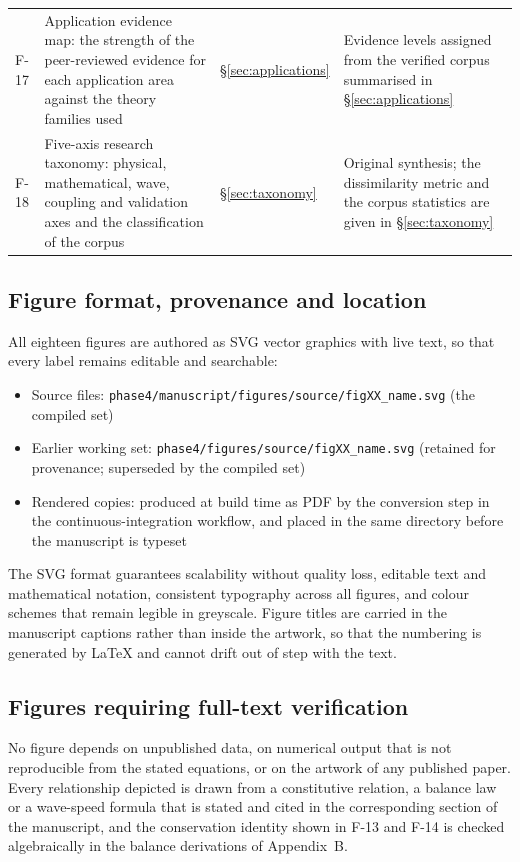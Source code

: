 \begin{table}[h]
\begin{tabularx}{\textwidth}{@{}lXlX@{}}
F-17 & Application evidence map: the strength of the peer-reviewed evidence for each application area against the theory families used & \S\ref{sec:applications} & Evidence levels assigned from the verified corpus summarised in \S\ref{sec:applications} \\
F-18 & Five-axis research taxonomy: physical, mathematical, wave, coupling and validation axes and the classification of the corpus & \S\ref{sec:taxonomy} & Original synthesis; the dissimilarity metric and the corpus statistics are given in \S\ref{sec:taxonomy} \\
\bottomrule
\end{tabularx}
\end{table}

\subsection{Figure format, provenance and location}

All eighteen figures are authored as SVG vector graphics with live text, so that every label remains editable and searchable:

\begin{itemize}
\item Source files: \texttt{phase4/manuscript/figures/source/figXX\_name.svg} (the compiled set)
\item Earlier working set: \texttt{phase4/figures/source/figXX\_name.svg} (retained for provenance; superseded by the compiled set)
\item Rendered copies: produced at build time as PDF by the conversion step in the continuous-integration workflow, and placed in the same directory before the manuscript is typeset
\end{itemize}

The SVG format guarantees scalability without quality loss, editable text and mathematical notation, consistent typography across all figures, and colour schemes that remain legible in greyscale. Figure titles are carried in the manuscript captions rather than inside the artwork, so that the numbering is generated by \LaTeX{} and cannot drift out of step with the text.

\subsection{Figures requiring full-text verification}

No figure depends on unpublished data, on numerical output that is not reproducible from the stated equations, or on the artwork of any published paper. Every relationship depicted is drawn from a constitutive relation, a balance law or a wave-speed formula that is stated and cited in the corresponding section of the manuscript, and the conservation identity shown in F-13 and F-14 is checked algebraically in the balance derivations of Appendix~B.

